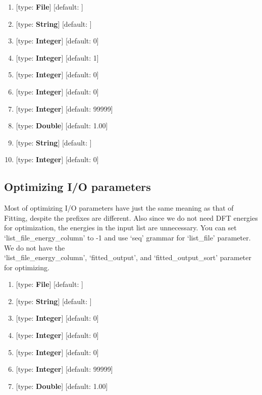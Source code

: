 \documentclass[11pt]{book}
\begin{document}
\begin{enumerate}
\item {} [type: \textbf{File}] [default: ]
\item {} [type: \textbf{String}] [default: ]
\item {} [type: \textbf{Integer}] [default: 0]
\item {} [type: \textbf{Integer}] [default: 1]
\item {} [type: \textbf{Integer}] [default: 0]
\item {} [type: \textbf{Integer}] [default: 0]
\item {} [type: \textbf{Integer}] [default: 99999]
\item {} [type: \textbf{Double}] [default: 1.00]
\item {} [type: \textbf{String}] [default: ]
\item {} [type: \textbf{Integer}] [default: 0]
\end{enumerate}

\subsection{Optimizing I/O parameters}

Most of optimizing I/O parameters have just the same meaning as that of Fitting, despite the prefixes are different. Also since we do not need DFT energies for 
optimization, the energies in the input list are unnecessary. You can set `list\_file\_energy\_column' to -1 and use `seq' grammar for `list\_file' parameter. 
We do not have the \\ `list\_file\_energy\_column', `fitted\_output', and `fitted\_output\_sort' parameter for optimizing.

\begin{enumerate}
\item {} [type: \textbf{File}] [default: ]
\item {} [type: \textbf{String}] [default: ]
\item {} [type: \textbf{Integer}] [default: 0]
\item {} [type: \textbf{Integer}] [default: 0]
\item {} [type: \textbf{Integer}] [default: 0]
\item {} [type: \textbf{Integer}] [default: 99999]
\item {} [type: \textbf{Double}] [default: 1.00]
\end{enumerate}
\end{document}
